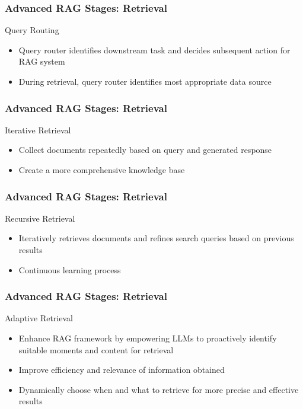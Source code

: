\begin{frame}[fragile]\frametitle{Advanced RAG Stages: Retrieval}
Query Routing
  \begin{itemize}
    \item Query router identifies downstream task and decides subsequent action for RAG system
    \item During retrieval, query router identifies most appropriate data source
  \end{itemize}
\end{frame}

\begin{frame}[fragile]\frametitle{Advanced RAG Stages: Retrieval}
Iterative Retrieval
  \begin{itemize}
    \item Collect documents repeatedly based on query and generated response
    \item Create a more comprehensive knowledge base
  \end{itemize}
\end{frame}

\begin{frame}[fragile]\frametitle{Advanced RAG Stages: Retrieval}
Recursive Retrieval
  \begin{itemize}
    \item Iteratively retrieves documents and refines search queries based on previous results
    \item Continuous learning process
  \end{itemize}
\end{frame}

\begin{frame}[fragile]\frametitle{Advanced RAG Stages: Retrieval}
Adaptive Retrieval
  \begin{itemize}
    \item Enhance RAG framework by empowering LLMs to proactively identify suitable moments and content for retrieval
    \item Improve efficiency and relevance of information obtained
    \item Dynamically choose when and what to retrieve for more precise and effective results
  \end{itemize}
\end{frame}

